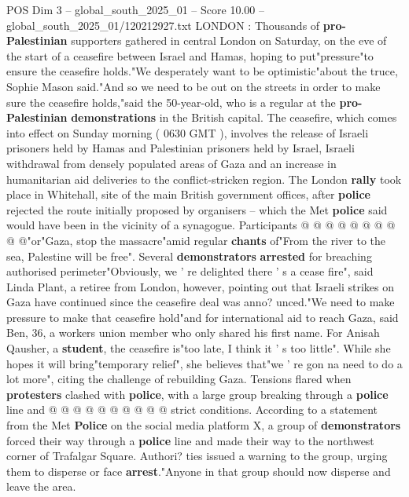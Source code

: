\begin{textsample}{POS Dim 3 – global\_south\_2025\_01 – Score 10.00 – global\_south\_2025\_01/120212927.txt}  \label{ex:f3_pos_403}
LONDON : Thousands of \textbf{pro-Palestinian} supporters gathered in central London on Saturday, on the eve of the start of a ceasefire between Israel and Hamas, hoping to put"pressure"to ensure the ceasefire holds."We desperately want to be optimistic"about the truce, Sophie Mason said."And so we need to be out on the streets in order to make sure the ceasefire holds,"said the 50-year-old, who is a regular at the \textbf{pro-Palestinian} \textbf{demonstrations} in the British capital.
The ceasefire, which comes into effect on Sunday morning ( 0630 GMT ), involves the release of Israeli prisoners held by Hamas and Palestinian prisoners held by Israel, Israeli withdrawal from densely populated areas of Gaza and an increase in humanitarian aid deliveries to the conflict-stricken region.
The London \textbf{rally} took place in Whitehall, site of the main British government offices, after \textbf{police} rejected the route initially proposed by organisers -- which the Met \textbf{police} said would have been in the vicinity of a synagogue.
Participants @ @ @ @ @ @ @ @ @ @"or"Gaza, stop the massacre"amid regular \textbf{chants} of"From the river to the sea, Palestine will be free".
Several \textbf{demonstrators} \textbf{arrested} for breaching authorised perimeter"Obviously, we ' re delighted there ' s a cease fire", said Linda Plant, a retiree from London, however, pointing out that Israeli strikes on Gaza have continued since the ceasefire deal was anno? unced."We need to make pressure to make that ceasefire hold"and for international aid to reach Gaza, said Ben, 36, a workers union member who only shared his first name.
For Anisah Qausher, a \textbf{student}, the ceasefire is"too late, I think it ' s too little".
While she hopes it will bring"temporary relief", she believes that"we ' re gon na need to do a lot more", citing the challenge of rebuilding Gaza.
Tensions flared when \textbf{protesters} clashed with \textbf{police}, with a large group breaking through a \textbf{police} line and @ @ @ @ @ @ @ @ @ @ strict conditions.
According to a statement from the Met \textbf{Police} on the social media platform X, a group of \textbf{demonstrators} forced their way through a \textbf{police} line and made their way to the northwest corner of Trafalgar Square.
Authori? ties issued a warning to the group, urging them to disperse or face \textbf{arrest}."Anyone in that group should now disperse and leave the area.

\end{textsample}
